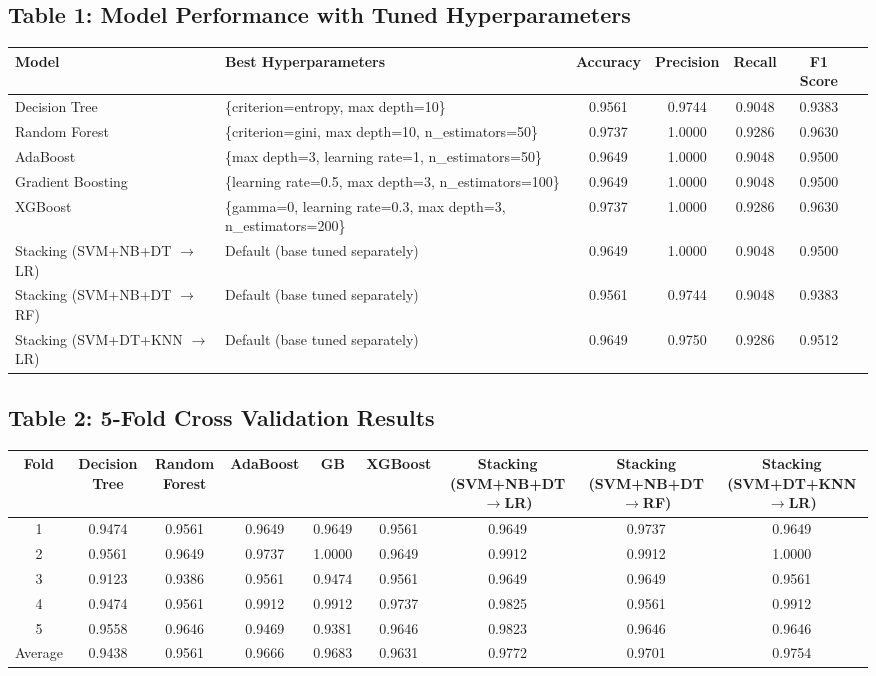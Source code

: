 \documentclass[12pt,a4paper]{article}
\begin{document}
\subsection*{Table 1: Model Performance with Tuned Hyperparameters}
\begin{longtable}{|>{\raggedright}p{3cm}|>{\raggedright}p{4cm}|c|c|c|c|c|}
\hline
Model & Best Hyperparameters & Accuracy & Precision & Recall & F1 Score  \\ \hline
Decision Tree & \{criterion=entropy, max depth=10\} & 0.9561 & 0.9744 & 0.9048 & 0.9383 \\
Random Forest & \{criterion=gini, max depth=10, n\_estimators=50\} & 0.9737 & 1.0000 & 0.9286 & 0.9630 \\
AdaBoost & \{max depth=3, learning rate=1, n\_estimators=50\} & 0.9649 & 1.0000 & 0.9048 & 0.9500  \\
Gradient Boosting & \{learning rate=0.5, max depth=3, n\_estimators=100\} & 0.9649 & 1.0000 & 0.9048 & 0.9500 \\
XGBoost & \{gamma=0, learning rate=0.3, max depth=3, n\_estimators=200\} & 0.9737 & 1.0000 & 0.9286 & 0.9630 \\
Stacking (SVM+NB+DT $\rightarrow$ LR) & Default (base tuned separately) & 0.9649 & 1.0000 & 0.9048 & 0.9500 \\
Stacking (SVM+NB+DT $\rightarrow$ RF) & Default (base tuned separately) & 0.9561 & 0.9744 & 0.9048 & 0.9383  \\
Stacking (SVM+DT+KNN $\rightarrow$ LR) & Default (base tuned separately) & 0.9649 & 0.9750 & 0.9286 & 0.9512  \\
\hline
\end{longtable}

\subsection*{Table 2: 5-Fold Cross Validation Results}
\begin{longtable}{|c|c|c|c|c|c|c|c|c|}
\hline
Fold & Decision Tree & Random Forest & AdaBoost & GB & XGBoost & Stacking (SVM+NB+DT$\rightarrow$LR) & Stacking (SVM+NB+DT$\rightarrow$RF) & Stacking (SVM+DT+KNN$\rightarrow$LR) \\ \hline
1 & 0.9474 & 0.9561 & 0.9649 & 0.9649 & 0.9561 & 0.9649 & 0.9737 & 0.9649 \\
2 & 0.9561 & 0.9649 & 0.9737 & 1.0000 & 0.9649 & 0.9912 & 0.9912 & 1.0000 \\
3 & 0.9123 & 0.9386 & 0.9561 & 0.9474 & 0.9561 & 0.9649 & 0.9649 & 0.9561 \\
4 & 0.9474 & 0.9561 & 0.9912 & 0.9912 & 0.9737 & 0.9825 & 0.9561 & 0.9912 \\
5 & 0.9558 & 0.9646 & 0.9469 & 0.9381 & 0.9646 & 0.9823 & 0.9646 & 0.9646 \\ \hline
Average & 0.9438 & 0.9561 & 0.9666 & 0.9683 & 0.9631 & 0.9772 & 0.9701 & 0.9754 \\ \hline
\end{longtable}
\end{document}
